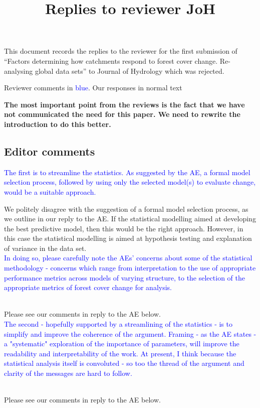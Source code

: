 \documentclass[]{elsarticle} %
\begin{document}
\begin{frontmatter}

  \title{Replies to reviewer JoH}
    \author[]{}
  
      
  \begin{abstract}
  
  \end{abstract}
  
 \end{frontmatter}

This document records the replies to the reviewer for the first submission of ``Factors determining how catchments respond to forest cover change. Re-analysing global data sets'' to Journal of Hydrology which was rejected.

Reviewer comments in \textcolor{blue}{blue}. Our responses in normal text

\textbf{The most important point from the reviews is the fact that we have not communicated the need for this paper. We need to rewrite the introduction to do this better.}

\hypertarget{editor-comments}{%
\subsection{Editor comments}\label{editor-comments}}

\textcolor{blue}{The first is to streamline the statistics.  As suggested by the AE, a formal model selection process, followed by using only the selected model(s) to evaluate change, would be a suitable approach.} ~

We politely disagree with the suggestion of a formal model selection process, as we outline in our reply to the AE. If the statistical modelling aimed at developing the best predictive model, then this would be the right approach. However, in this case the statistical modelling is aimed at hypothesis testing and explanation of variance in the data set. ~\\
\textcolor{blue}{In doing so, please carefully note the AEs' concerns about some of the statistical methodology - concerns which range from interpretation to the use of appropriate performance metrics across models of varying structure, to the selection of the appropriate metrics of forest cover change for analysis.}\\
\strut \\
Please see our comments in reply to the AE below.\\
\hspace*{0.333em}
\textcolor{blue}{The second - hopefully supported by a streamlining of the statistics - is to simplify and improve the coherence of the argument.  Framing - as the AE states - a "systematic" exploration of the importance of parameters, will improve the readability and interpretability of the work.  At present, I think because the statistical analysis itself is convoluted - so too the thread of the argument and clarity of the messages are hard to follow.}\\
\strut \\
Please see our comments in reply to the AE below.\\
\strut \\
\end{document}
